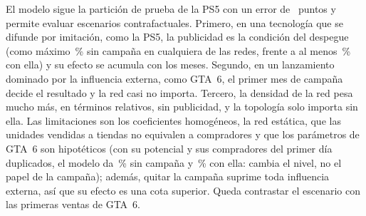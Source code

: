 \documentclass[runningheads]{llncs}
\begin{document}
El modelo sigue la partición de prueba de la PS5 con un error de \cifraAbmRmsePru\ puntos y permite evaluar escenarios contrafactuales. Primero, en una tecnología que se difunde por imitación, como la PS5, la publicidad es la condición del despegue (como máximo \cifraPsSinMaxGlobal\,\% sin campaña en cualquiera de las redes, frente a al menos \cifraPsConMin\,\% con ella) y su efecto se acumula con los meses. Segundo, en un lanzamiento dominado por la influencia externa, como GTA~6, el primer mes de campaña decide el resultado y la red casi no importa. Tercero, la densidad de la red pesa mucho más, en términos relativos, sin publicidad, y la topología solo importa sin ella. Las limitaciones son los coeficientes homogéneos, la red estática, que las unidades vendidas a tiendas no equivalen a compradores y que los parámetros de GTA~6 son hipotéticos (con su potencial y sus compradores del primer día duplicados, el modelo da \cifraSensDobleSin\,\% sin campaña y \cifraSensDobleCon\,\% con ella: cambia el nivel, no el papel de la campaña); además, quitar la campaña suprime toda influencia externa, así que su efecto es una cota superior. Queda contrastar el escenario con las primeras ventas de GTA~6.



\end{document}
